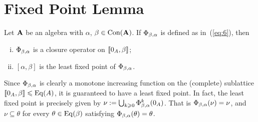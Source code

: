 

\section{Fixed Point Lemma}
\begin{lemma}
  \label{lem:fixed-point-comm}
  Let $\mathbf{A}$ be an algebra with $\alpha$, $\beta\in \operatorname{Con}(\mathbf{A})$.
  If
  $\Phi_{\beta, \alpha}$ is defined as in~(\ref{eq:6}), then
  \begin{enumerate}[(i)]
  \item \label{item:1} $\Phi_{\beta, \alpha}$ is a closure operator on %
    $\llbracket 0_A, \beta\rrbracket$;
  \item \label{item:2} $[\alpha, \beta]$ is the least fixed point of $\Phi_{\beta, \alpha}$.
  \end{enumerate}
\end{lemma}
\begin{remark}
  Since $\Phi_{\beta, \alpha}$ is clearly a monotone increasing function on the (complete) sublattice
  $\llbracket 0_A, \beta\rrbracket \leqslant \operatorname{Eq}(A)$, it is guaranteed to have a least fixed point.  In fact,
  the least fixed point is precisely given by 
  $\nu := \bigcup_{k\geqslant 0} \Phi_{\beta, \alpha}^{k}(0_A)$.
  That is $\Phi_{\beta, \alpha}(\nu) = \nu$,
  and $\nu \subseteq \theta$ for every $\theta\in \operatorname{Eq}(\beta)$
  satisfying $\Phi_{\beta, \alpha}(\theta) = \theta$.
   
\end{remark}

